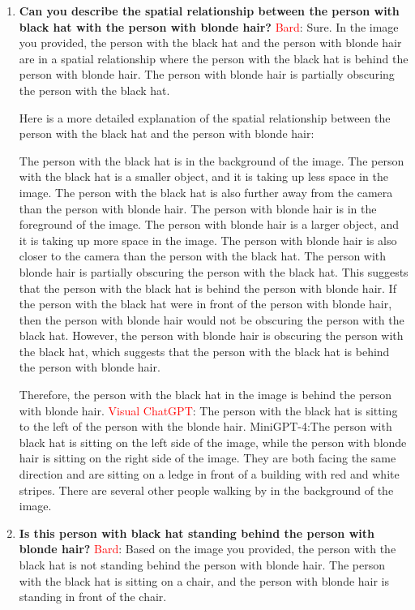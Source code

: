 \begin{enumerate}
    \item \textbf{Can you describe the spatial relationship between the person with black hat with the person with blonde hair?}
    \subitem \textcolor{Red}{Bard}: 
    Sure. In the image you provided, the person with the black hat and the person with blonde hair are in a spatial relationship where the person with the black hat is behind the person with blonde hair. The person with blonde hair is partially obscuring the person with the black hat.
    
    Here is a more detailed explanation of the spatial relationship between the person with the black hat and the person with blonde hair:
    
    The person with the black hat is in the background of the image. The person with the black hat is a smaller object, and it is taking up less space in the image. The person with the black hat is also further away from the camera than the person with blonde hair.
    The person with blonde hair is in the foreground of the image. The person with blonde hair is a larger object, and it is taking up more space in the image. The person with blonde hair is also closer to the camera than the person with the black hat.
    The person with blonde hair is partially obscuring the person with the black hat. This suggests that the person with the black hat is behind the person with blonde hair.
    If the person with the black hat were in front of the person with blonde hair, then the person with blonde hair would not be obscuring the person with the black hat. However, the person with blonde hair is obscuring the person with the black hat, which suggests that the person with the black hat is behind the person with blonde hair.
    
    Therefore, the person with the black hat in the image is behind the person with blonde hair.     
    \subitem \textcolor{red}{Visual ChatGPT}: The person with the black hat is sitting to the left of the person with the blonde hair.
    \subitem MiniGPT-4:The person with black hat is sitting on the left side of the image, while the person with blonde hair is sitting on the right side of the image. They are both facing the same direction and are sitting on a ledge in front of a building with red and white stripes. There are several other people walking by in the background of the image. 
    \item \textbf{Is this person with black hat standing behind the person with blonde hair?}
    \subitem \textcolor{Red}{Bard}: 
    Based on the image you provided, the person with the black hat is not standing behind the person with blonde hair. The person with the black hat is sitting on a chair, and the person with blonde hair is standing in front of the chair.
    

\end{enumerate}
